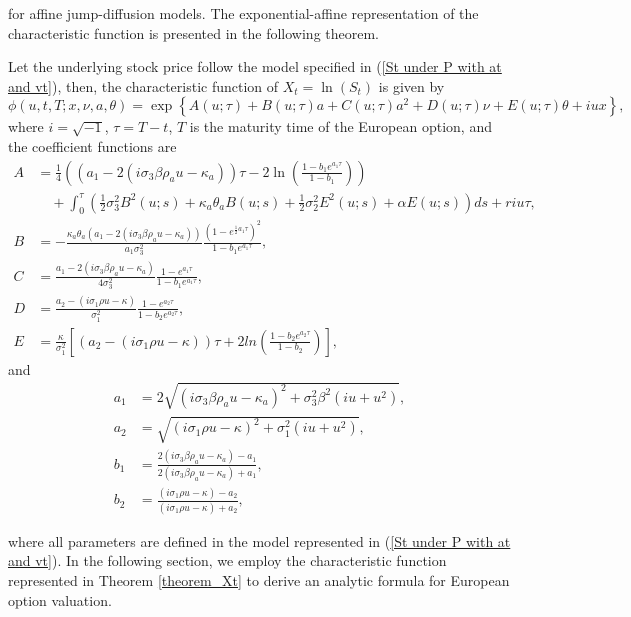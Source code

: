 \documentclass[twoside]{article}
\begin{document}
for affine jump-diffusion models. The exponential-affine representation of the characteristic function is presented in the following theorem. 
%
\begin{thm}\label{theorem_Xt}
Let the underlying stock price follow the model specified in (\ref{St under P with at and vt}), then, the characteristic function of $X_t = \ln(S_t)$ is given by
\begin{equation}\label{AffineChf}
\phi(u,t,T;x,\nu, a, \theta) = \exp \left\lbrace A(u;\tau) + B(u;\tau)a + C(u;\tau)a^2 +D(u ;\tau)\nu + E(u ;\tau)\theta + iux \right\rbrace , 
\end{equation}
where $i=\sqrt{-1}$, $\tau=T-t$, $ T $ is the maturity time of the European option, and the coefficient functions are
%
\begin{align*}
A &= \frac{1}{4} \left( \left( a_1 - 2(i \sigma_3 \beta \rho_{a} u - \kappa_a) \right) \tau 
- 2 \ln\left( \frac{1 - b_1 e^{a_1 \tau}}{1 - b_1} \right) \right) 
\nonumber \\ &\quad 
+ \int_0^\tau \left( \frac{1}{2} \sigma_3^2 B^2(u; s) + \kappa_a \theta_a B(u; s) + \frac{1}{2} \sigma_2^2 E^2(u; s) 
+ \alpha E(u; s)  \right) ds + r i u \tau,  %
\\
B &= -\frac{ \kappa_a \theta_a \left( a_1 - 2(i \sigma_3 \beta \rho_a u - \kappa_a) \right)}{a_1 \sigma_3^2}
\frac{\left( 1 - e^{\frac{1}{2} a_1 \tau} \right)^2}{1 - b_1 e^{a_1 \tau}},  %
\\
C &= \frac{a_1 - 2(i \sigma_3 \beta \rho_a u - \kappa_a)}{4 \sigma_3^2} \frac{1 - e^{a_1 \tau}}{1 - b_1 e^{a_1 \tau}},  %
\\
D &= \frac{a_2 - (i \sigma_1 \rho u - \kappa) }{\sigma_1^2} \frac{1 - e^{a_2 \tau}}{1 - b_2 e^{a_2 \tau}},  %
\\
E &= \frac{\kappa}{\sigma^2_1}\left[ \left( a_2 - (i \sigma_1 \rho u - \kappa )  \right)\tau  
+ 2 ln\left( \frac{1-b_2e^{a_2\tau}}{1-b_2} \right)  \right],  %
\end{align*}
and
\begin{align*}
a_1 &= 2\sqrt{( i \sigma_3 \beta \rho_a  u - \kappa_a )^2 + \sigma_3^2 \beta^2 (i u + u^2)}, \\
a_2 &= \sqrt{(i \sigma_1   \rho  u -  \kappa )^2 + \sigma_1^2 (i u + u^2)}, \\
b_1 &= \frac{2( i \sigma_3 \beta \rho_a  u - \kappa_a) - a_1}{2(i \sigma_3 \beta \rho_a  u - \kappa_a) + a_1}, \\
b_2 &= \frac{(i \sigma_1   \rho  u -  \kappa ) - a_2}{(i \sigma_1   \rho  u -  \kappa) + a_2},
\end{align*}
\end{thm}
\noindent
where all parameters are defined in the model represented in (\ref{St under P with at and vt}). In the following section, we employ the characteristic 
function represented in Theorem \ref{theorem_Xt} to derive an analytic formula for European option valuation.
\end{document}
